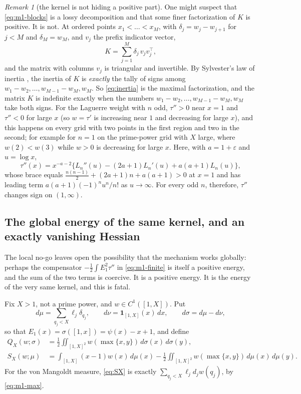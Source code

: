 \documentclass[11pt]{amsart}
\theoremstyle{definition}
\theoremstyle{remark}
\newtheorem{remark}[theorem]{Remark}
\theoremstyle{definition}
\newcommand{\eps}{\varepsilon}
\begin{document}
\begin{remark}[the kernel is not hiding a positive part]\label{rmk:inertia}
One might suspect that \eqref{eq:m1-blocks} is a lossy decomposition and that some finer
factorization of $K$ is positive. It is not. At ordered points $x_1<\dots<x_M$, with
$\delta_j=w_j-w_{j+1}$ for $j<M$ and $\delta_M=w_M$, and $v_j$ the prefix indicator vector,
\begin{equation}\label{eq:inertia}
   K=\sum_{j=1}^M\delta_j\,v_jv_j^{\!\top} ,
\end{equation}
and the matrix with columns $v_j$ is triangular and invertible. By Sylvester's law of inertia
\cite{HornJohnson}, the inertia of $K$ is \emph{exactly} the tally of signs among
$w_1-w_2,\dots,w_{M-1}-w_M,w_M$. So \eqref{eq:inertia} is the maximal factorization, and the
matrix $K$ is indefinite exactly when the numbers $w_1-w_2,\dots,w_{M-1}-w_M,w_M$ take both
signs. For the Laguerre weight with $n$ odd, $\tau''>0$ near $x=1$ and $\tau''<0$ for large $x$
(so $w=\tau'$ is increasing near $1$ and decreasing for large $x$), and this happens on every
grid with two points in the first region and two in the second; for example for $n=1$ on the
prime-power grid with $X$ large, where $w(2)<w(3)$ while $w>0$ is decreasing for large $x$. Here,
with $a=1+\eps$ and $u=\log x$,
\[
   \tau''(x)=x^{-a-2}\bigl\{L_n''(u)-(2a+1)L_n'(u)+a(a+1)L_n(u)\bigr\},
\]
whose brace equals $\tfrac{n(n-1)}{2}+(2a+1)n+a(a+1)>0$ at $x=1$ and has leading term
$a(a+1)(-1)^nu^n/n!$ as $u\to\infty$. For every odd $n$, therefore, $\tau''$ changes sign on
$(1,\infty)$.
\end{remark}

\subsection{The global energy of the same kernel, and an exactly vanishing Hessian}
\label{sec:m1-global}

The local no-go leaves open the possibility that the mechanism works globally: perhaps the
compensator $-\tfrac12\int E_1^2\tau''$ in \eqref{eq:m1-finite} is itself a positive energy, and
the sum of the two terms is coercive. It is a positive energy. It is the energy of the very same
kernel, and this is fatal.

Fix $X>1$, not a prime power, and $w\in C^1([1,X])$. Put
\begin{equation}\label{eq:measures}
   d\mu=\sum_{q_j<X}\ell_j\delta_{q_j},\qquad
   d\nu=\mathbf1_{[1,X]}(x)\,dx,\qquad
   d\sigma=d\mu-d\nu ,
\end{equation}
so that $E_1(x)=\sigma([1,x])=\psi(x)-x+1$, and define
\begin{align}
   Q_X(w;\sigma)&=\frac12\iint_{[1,X]^2}w(\max\{x,y\})\,d\sigma(x)\,d\sigma(y),
   \label{eq:QX}\\
   S_X(w;\mu)&=\int_{[1,X]}(x-1)w(x)\,d\mu(x)
   -\frac12\iint_{[1,X]^2}w(\max\{x,y\})\,d\mu(x)\,d\mu(y).
   \label{eq:SX}
\end{align}
For the von Mangoldt measure, \eqref{eq:SX} is exactly $\sum_{q_j<X}\ell_jd_jw(q_j)$, by
\eqref{eq:m1-max}.
\end{document}
